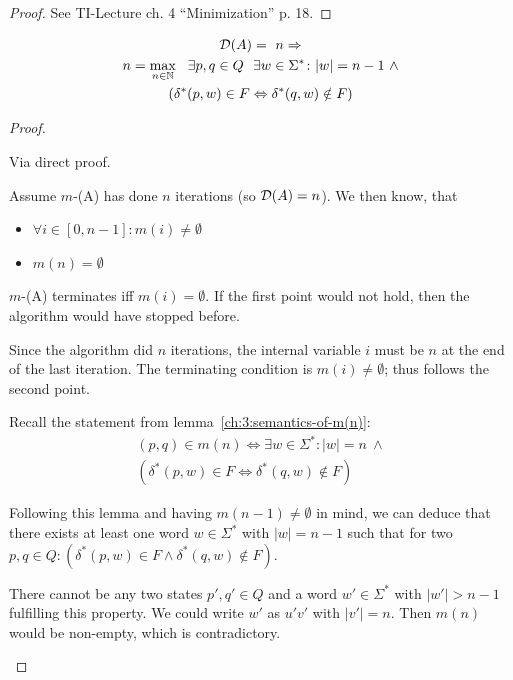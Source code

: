 \begin{proof}
	See TI-Lecture ch. 4 ``Minimization'' p. 18.
\end{proof}

\begin{lemma}[Semantics of $\mmD(A) = n$] \label{ch:3:semantics-of-D(A)}
	\begin{multline*}
		\mathcal{D}(A) =\ n \Rightarrow \\
		n = \max_{n \in \mathbb{N}}\ \ \exists p, q \in Q\ \ \exists w \in \Sigma^* \colon |w| = n - 1\ \land \\
		(\delta^*(p,w) \in F \Leftrightarrow \delta^*(q,w) \notin F)
	\end{multline*}
\end{lemma}

\begin{proof}
	\begin{description}
		\item
		
		Via direct proof.
		
		Assume $m$-\CompDist(A) has done $n$ iterations (so $\mmD(A) = n$). We then know, that
		\begin{itemize}
			\item $\forall i \in [0,n-1]\colon m(i) \neq \emptyset$
			\item $m(n)= \emptyset$
		\end{itemize}
		$m$-\CompDist(A) terminates iff $m(i) = \emptyset$. If the first point would not hold, then the algorithm would have stopped before.
		
		Since the algorithm did $n$ iterations, the internal variable $i$ must be $n$ at the end of the last iteration. The terminating condition is $m(i) \neq \emptyset$; thus follows the second point.
		
		Recall the statement from lemma~\ref{ch:3:semantics-of-m(n)}:
		\begin{multline*}
		(p,q) \in m(n) \Longleftrightarrow 
		\exists w\in\Sigma^*\colon |w| = n\ \land \\
		(\delta^*(p,w) \in F \Leftrightarrow \delta^*(q,w) \notin F)
		\end{multline*}
	
		
		Following this lemma and having $m(n-1) \neq \emptyset$ in mind, we can deduce that there exists at least one word $w\in\Sigma^*$ with $|w| = n-1$ such that for two $p,q \in Q\colon (\delta^*(p,w) \in F \land \delta^*(q,w) \notin F)$.
		
		
		There cannot be any two states $p',q'\in Q$ and a word $w'\in\Sigma^*$ with $|w'| > n-1$ fulfilling this property. We could write $w'$ as $u'v'$ with $|v'| = n$. Then $m(n)$ would be non-empty, which is contradictory.
	\end{description}
\end{proof}

